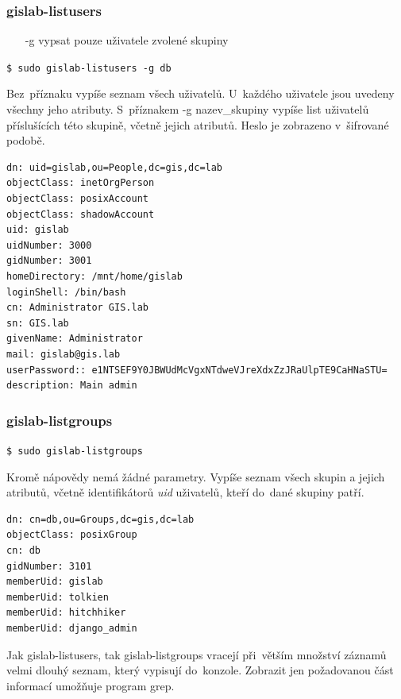 \subsubsection{gislab-listusers}
\begin{itemize}
\item [-g] vypsat pouze uživatele zvolené skupiny
\end{itemize}

\begin{center}
\texttt{\$ sudo gislab-listusers -g db}
\end{center}

Bez~příznaku vypíše seznam všech uživatelů. U~každého uživatele jsou
uvedeny všechny jeho atributy. S~příznakem \textsf{-g nazev\_skupiny}
vypíše list uživatelů příslušících této skupině, včetně jejich
atributů. Heslo je zobrazeno v~šifrované podobě.

\begin{verbatim}
dn: uid=gislab,ou=People,dc=gis,dc=lab
objectClass: inetOrgPerson
objectClass: posixAccount
objectClass: shadowAccount
uid: gislab
uidNumber: 3000
gidNumber: 3001
homeDirectory: /mnt/home/gislab
loginShell: /bin/bash
cn: Administrator GIS.lab
sn: GIS.lab
givenName: Administrator
mail: gislab@gis.lab
userPassword:: e1NTSEF9Y0JBWUdMcVgxNTdweVJreXdxZzJRaUlpTE9CaHNaSTU=
description: Main admin
\end{verbatim}

\subsubsection{gislab-listgroups}
\begin{center}
\texttt{\$ sudo gislab-listgroups}
\end{center}

Kromě nápovědy nemá žádné parametry. Vypíše seznam všech skupin a
jejich atributů, včetně identifikátorů \textit{uid} uživatelů, kteří
do~dané skupiny patří.

\begin{verbatim}
dn: cn=db,ou=Groups,dc=gis,dc=lab
objectClass: posixGroup
cn: db
gidNumber: 3101
memberUid: gislab
memberUid: tolkien
memberUid: hitchhiker
memberUid: django_admin
\end{verbatim}

Jak \textsf{gislab-listusers}, tak \textsf{gislab-listgroups} vracejí
při~větším množství záznamů velmi dlouhý seznam, který vypisují 
do~konzole. Zobrazit jen požadovanou část informací umožňuje program
grep.

